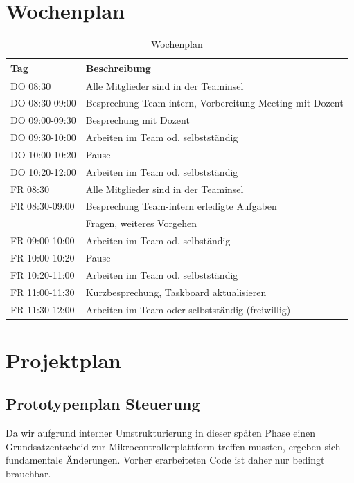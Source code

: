 \documentclass[a4paper]{report}
\begin{document}
\section{Wochenplan}
\label{sec:Wochenplan}
\begin{table}[h!]
	\begin{tabular}{|p{}|p{}|}
		\hline
		\textbf{Tag} & \textbf{Beschreibung} \\
		\hline
		DO 08:30 & Alle Mitglieder sind in der Teaminsel \\
		\hline
		DO 08:30-09:00 & Besprechung Team-intern, Vorbereitung Meeting mit Dozent \\
		\hline
		DO 09:00-09:30& Besprechung mit Dozent \\
		\hline
		DO 09:30-10:00 & Arbeiten im Team od. selbstständig \\
		\hline
		DO 10:00-10:20 & Pause \\
		\hline
		DO 10:20-12:00 & Arbeiten im Team od. selbstständig \\
		\hline
		FR 08:30 & Alle Mitglieder sind in der Teaminsel \\
		\hline
		FR 08:30-09:00 & Besprechung Team-intern erledigte Aufgaben \\
		& Fragen, weiteres Vorgehen \\
		\hline
		FR 09:00-10:00 & Arbeiten im Team od. selbständig \\
		\hline
		FR 10:00-10:20 & Pause \\
		\hline
		FR 10:20-11:00 & Arbeiten im Team od. selbstständig \\
		\hline
		FR 11:00-11:30 & Kurzbesprechung, Taskboard aktualisieren \\
		\hline
		FR 11:30-12:00 & Arbeiten im Team oder selbstständig (freiwillig)\\
		\hline
	\end{tabular}
	\caption{Wochenplan}
	\label{tab:Wochenplan}
\end{table}

\newpage

\section{Projektplan}
\label{sec:Projektplan}

\subsection{Prototypenplan Steuerung}
\label{ssec:ProtoSteuerung}
Da wir aufgrund interner Umstrukturierung in dieser späten Phase einen Grundsatzentscheid zur Mikrocontrollerplattform treffen mussten, ergeben sich fundamentale Änderungen. Vorher erarbeiteten Code ist daher nur bedingt brauchbar.
\end{document}
